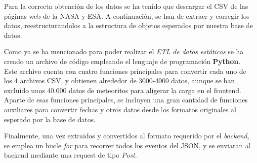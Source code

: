 Para la correcta obtención de los datos se ha tenido que descargar el CSV de las páginas web de la NASA y ESA. 
A continuación, se han de extraer y corregir los datos, reestructurandolos a la estructura de objetos esperados por nuestra base de datos. 



Como ya se ha mencionado para poder realizar el \textit{ETL de datos estáticos} se ha creado un archivo de código empleando el lenguaje de programación \textbf{Python}. 
Este archivo cuenta con cuatro funciones principales para convertir cada uno de los 4 archivos CSV, y obtienen alrededor de 3000-4000 datos, aunque se han excluido unos 40.000 datos de meteoritos para aligerar la carga en el frontend. 
Aparte de esas funciones principales, se incluyen una gran cantidad de funciones auxiliares para convertir fechas y otros datos desde los formatos originales al esperado por la base de datos.

Finalmente, una vez extraidos y convertidos al formato requerido por el \textit{backend}, se emplea un bucle \textit{for} para recorrer todos los eventos del JSON, y se enviaran al backend mediante una request de tipo \textit{Post}.
